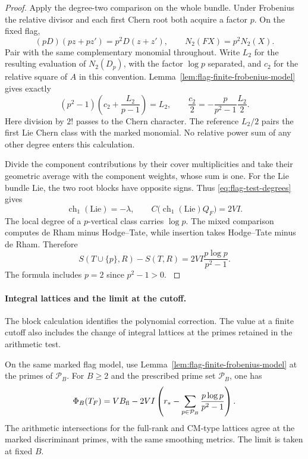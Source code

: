 \begin{proof}
Apply the degree-two comparison on the whole bundle. Under Frobenius the relative divisor and each first Chern root both acquire a factor \(p\). On the fixed flag,
\[
    (pD)(pz+pz')=p^2D(z+z'),\qquad N_2(FX)=p^2N_2(X).
\]
Pair with the same complementary monomial throughout. Write \(L_2\) for the resulting evaluation of \(N_2(D_p)\), with the factor \(\log p\) separated, and \(c_2\) for the relative square of \(A\) in this convention. Lemma~\ref{lem:flag-finite-frobenius-model} gives exactly
\[
  (p^2-1)\left(c_2+\frac{L_2}{p-1}\right)=L_2,\qquad
  \frac{c_2}{2}=-\frac{p}{p^2-1}\frac{L_2}{2}.
\]
Here division by \(2!\) passes to the Chern character. The reference \(L_2/2\) pairs the first Lie Chern class with the marked monomial. No relative power sum of any other degree enters this calculation.
\label{cor:covolume-flag-test-12}

Divide the component contributions by their cover multiplicities
and take their geometric average with the component weights, whose sum is one. For the Lie bundle \(\mathrm{Lie}\), the two root blocks have opposite signs. Thus \eqref{eq:flag-test-degrees} gives
\[
 \operatorname{ch}_1(\mathrm{Lie})=-\lambda,\qquad
 C\bigl(\operatorname{ch}_1(\mathrm{Lie})Q_F\bigr)=2VI .
\]
The local degree of a \(p\)-vertical class carries
\(\log p\). The mixed comparison computes de Rham
minus Hodge--Tate, while insertion takes Hodge--Tate
minus de Rham. Therefore
\begin{equation}\label{eq:flag-prime-insertion}
 S(T\cup\{p\},R)-S(T,R)
        =2VI\frac{p\log p}{p^2-1}.
\end{equation}
The formula includes \(p=2\) since \(p^2-1>0\).
\label{cor:covolume-flag-test-13}

\end{proof}

\paragraph{Integral lattices and the limit at the cutoff.}

The block calculation identifies the polynomial correction. The value at a finite cutoff also includes the change of integral lattices at the primes retained in the arithmetic test.

\begin{proposition}\label{prop:flag-cutoff-test}
On the same marked flag model, use Lemma~\ref{lem:flag-finite-frobenius-model} at the primes of \(\mathcal P_B\). For \(B\ge2\) and the prescribed
prime set \(\mathcal P_B\), one has
\[
 \Phi_B(T_F)=VB_{\rm fl}
            -2VI\left(r_*-\sum_{p\in\mathcal P_B}
                              \frac{p\log p}{p^2-1}\right).
\]
The arithmetic intersections for the full-rank and CM-type lattices agree at the
marked discriminant primes, with the same smoothing metrics.
The limit is taken at fixed \(B\).
\end{proposition}

